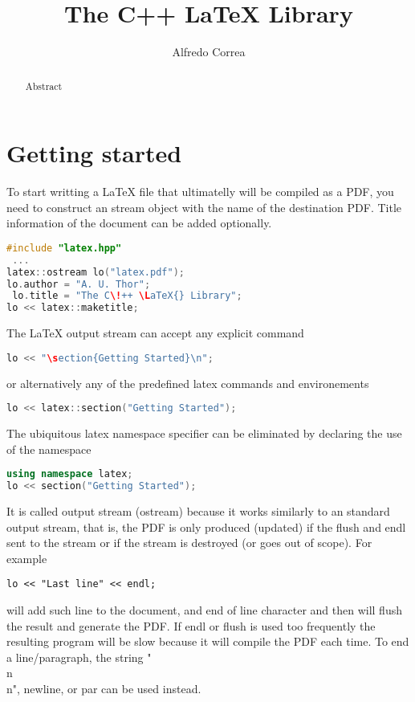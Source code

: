 \documentclass[12pt,fleqn]{tufte-handout}
\title{The C++ LaTeX Library}
\author{Alfredo Correa}
\let\n\textLF
\begin{document}
\maketitle

\begin{abstract}
Abstract \lipsum[1]
\label{0x7fffe2025750}
\end{abstract}


\section{Getting started}
To start writting a LaTeX file that ultimatelly will be compiled as a PDF, you need to construct an stream object with the name of the destination PDF. Title information of the document can be added optionally. \begin{lstlisting}[frame=tb,language=C++]
#include "latex.hpp"
 ... 
latex::ostream lo("latex.pdf"); 
lo.author = "A. U. Thor"; 
 lo.title = "The C\!++ \LaTeX{} Library";
lo << latex::maketitle; 
\end{lstlisting}
The LaTeX output stream can accept any explicit command \begin{lstlisting}[frame=tb,language=C++]
lo << "\section{Getting Started}\n";\end{lstlisting}
or alternatively any of the predefined latex commands and environements
\begin{lstlisting}[frame=tb,language=C++]
lo << latex::section("Getting Started");\end{lstlisting}
The ubiquitous latex namespace specifier can be eliminated by declaring the use of the namespace \begin{lstlisting}[frame=tb,language=C++]
using namespace latex;
lo << section("Getting Started");\end{lstlisting}
It is called output stream (ostream) because it works similarly to an standard output stream, that is, the PDF is only produced (updated) if the flush and endl sent to the stream or if the stream is destroyed (or goes out of scope). For example\begin{lstlisting}
lo << "Last line" << endl;
\end{lstlisting}
will add such line to the document, and end of line character and then will flush the result and generate the PDF. If endl or flush is used too frequently the resulting program will be slow because it will compile the PDF each time. To end a line/paragraph, the string "\\n\\n", newline, or par can be used instead. 
\end{document}
